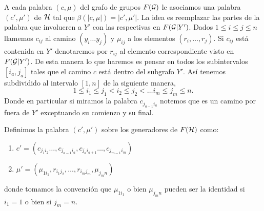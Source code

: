 \documentclass[tesis.tex]{subfiles}
\begin{document}
A cada palabra $(c, \mu)$ del grafo de grupos $F({\cal G})$ le asociamos una palabra $(c', \mu')$ de ${\cal H}$ tal que $\beta (|c,\mu|) = |c',\mu'|$.
La idea es reemplazar las partes de la palabra que involucren a $Y'$ con las respectivas en $F({\cal G} | Y')$.
Dados $ 1 \le i \le j \le n$ llamemos $c_{ij}$ al camino 
$(y_i \dots y_{j})$ y $\mu_{ij}$ a los elementos $(r_i, \dots, r_j)$.
Si $c_{ij}$ está contenida en $Y'$ denotaremos por $r_{ij}$ al elemento correspondiente visto en $F({\cal G} | Y')$.
De esta manera lo que haremos es pensar en todos los subintervalos $[i_a,j_a]$  tales que el camino $c$ está dentro del subgrafo $Y'$.
Así tenemos subdividido al intervalo $[1,n]$ de la siguiente manera,
\[
	1\le i_1 \le j_1 < i_2 \le j_2 < \dots i_m \le j_m \le n.
\]
Donde en particular si miramos la palabra $c_{j_{a-1}i_a}$ notemos que es un camino por fuera de $Y'$ exceptuando su comienzo y su final.

Definimos la palabra $(c', \mu')$ sobre los generadores de $F({\cal H})$ como:
\begin{enumerate}[1.]
	\item $c' = (c_{j_1i_2} \dots, c_{j_{a-1}i_a},c_{j_{a}i_{a+1}} \dots, c_{j_{m-1}i_{m}})$
	\item $\mu' = (\mu_{1i_1}, r_{i_1j_2}, \dots, r_{i_mj_m}, \mu_{j_m n} )  $
\end{enumerate}
donde tomamos la convención que $\mu_{1i_1}$ o bien $\mu_{j_m n}$ pueden ser la identidad si $i_1=1$ o bien si $j_m = n$.
\end{document}
